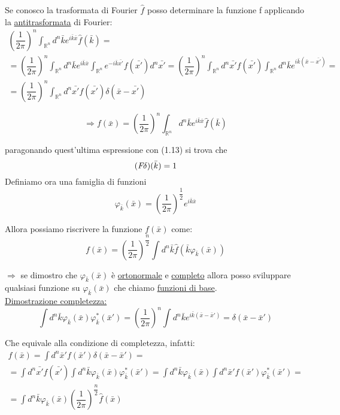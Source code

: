 \documentclass[a4paper,11pt]{report}
\newcommand{\Rn}{\mathbb{R}^n}
\newcommand{\fourier}{\emph{F}}
\newcommand{\x}{\bar{x}}
\newcommand{\xp}{\bar{x}'}
\newcommand{\kk}{\bar{k}}
\begin{document}
Se conosco la trasformata di Fourier $\hat{f}$ posso determinare la funzione f applicando la \underline{antitrasformata} di Fourier:
\begin{multline*}
\left(\dfrac{1}{2\pi}\right)^n\int_{\Rn}d^n\bar{k}e^{i\bar{k}\bar{x}}\hat{f}(\bar{k})=\\
=\left(\dfrac{1}{2\pi}\right)^n \int_{\Rn}d^n\bar{k}e^{i\bar{k}\bar{x}}\int_{\Rn}e^{-i\bar{k}\bar{x'}}f(\bar{x'})d^n\bar{x'}= \left(\dfrac{1}{2\pi}\right)^n\int_{\Rn}d^n\bar{x'}f(\bar{x'})\int_{\Rn}d^n\bar{k}e^{i\bar{k}\left(\bar{x}-\bar{x'}\right)}=\\
=\left(\dfrac{1}{2\pi}\right)^n\int_{\Rn}d^n\bar{x'}f(\bar{x'})\delta(\bar{x}-\bar{x'})
\end{multline*}

\begin{equation}
\Rightarrow f(\bar{x})=\left(\dfrac{1}{2\pi}\right)^n\int_{\Rn}d^n\bar{k}e^{i\bar{k}\bar{x}}\hat{f}(\bar{k})
\end{equation}

paragonando quest'ultima espressione con (1.13) si trova che
\begin{equation}
(\fourier\delta)(\kk)=1
\end{equation}
Definiamo ora una famiglia di funzioni
\begin{equation}
\varphi_{\kk}(\x)=\left(\dfrac{1}{2\pi}\right)^{\dfrac{1}{2}}e^{i\kk\x}
\end{equation}

Allora possiamo riscrivere la funzione $f(\x)$ come:
$$
f(\x)=\left(\dfrac{1}{2\pi}\right)^{\dfrac{n}{2}}\int d^n\kk\hat{f}(\kk\varphi_{\kk}(\x))
$$

$\Rightarrow$ se dimostro che $\varphi_{\bar{k}}(\bar{x})$ è \underline{ortonormale} e \underline{completo} allora posso sviluppare qualsiasi funzione su $\varphi_{\kk}(\x)$ che chiamo \underline{funzioni di base}.\\
\underline{Dimostrazione completezza:}
\begin{equation}
\int d^n\kk \varphi_{\kk}(\x)\varphi_{\kk}^{*}(\xp)=\left(\dfrac{1}{2\pi}\right)^n\int d^n\kk e^{i\kk(\x-\xp)}=\delta(\x-\xp)
\end{equation}

Che equivale alla condizione di completezza, infatti:
\begin{multline*}
f(\x)=\int d^n\xp f(\xp)\delta(\x-\xp)=\\
=\int d^n\bar{x'}f(\bar{x'})\int d^n\kk\varphi_{\kk}(\x)\varphi_{\kk}^{*}(\xp)=\int d^n\kk\varphi_{\kk}(\x)\int d^n\xp f(\xp)\varphi_{\kk}^{*}(\xp)=\\
=\int d^n\kk\varphi_{\kk}(\x)\left(\dfrac{1}{2\pi}\right)^{\dfrac{n}{2}}\hat{f}(\x)
\end{multline*}
\end{document}
